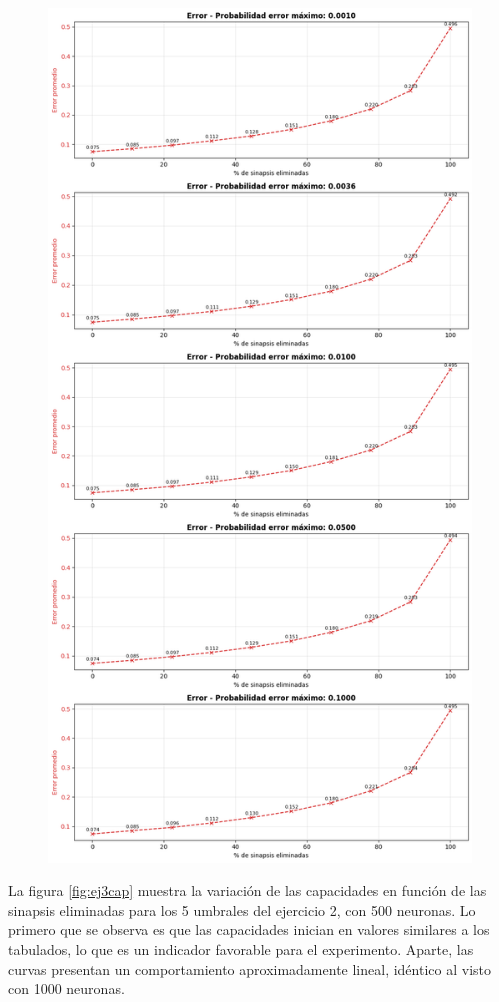 \documentclass[11pt]{article} %
\begin{document}
\begin{figure}[h!]
	\centering
	\includegraphics[width=0.79\linewidth]{imgs/ej3_err}
	\caption[Error vs Sinapsis eliminadas - 500 neuronas]{}
	\label{fig:ej3err}
\end{figure}
\newpage
\clearpage

La figura \ref{fig:ej3cap} muestra la variación de las capacidades en función de las sinapsis eliminadas para los 5 umbrales del ejercicio 2, con 500 neuronas. Lo primero que se observa es que las capacidades inician en valores similares a los tabulados, lo que es un indicador favorable para el experimento. Aparte, las curvas presentan un comportamiento aproximadamente lineal, idéntico al visto con 1000 neuronas. 
\end{document}
